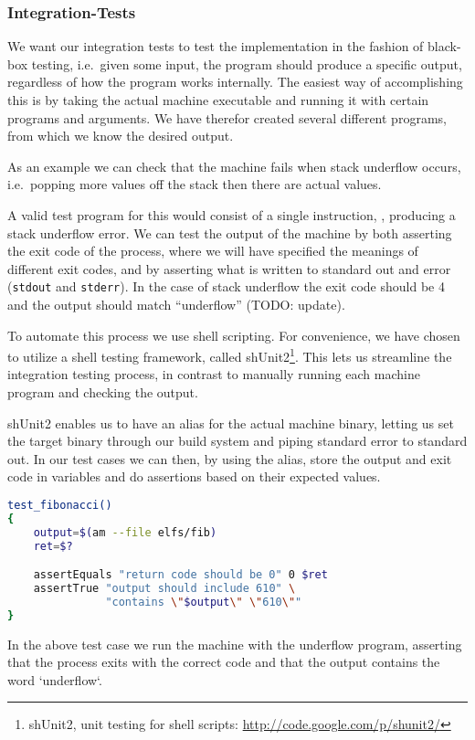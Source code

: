 \subsubsection{Integration-Tests}

We want our integration tests to test the implementation in the fashion of
black-box testing, i.e.~given some input, the program should produce a specific
output, regardless of how the program works internally. The easiest way of
accomplishing this is by taking the actual machine executable and running it
with certain programs and arguments. We have therefor created several different
programs, from which we know the desired output.

As an example we can check that the machine fails when stack underflow occurs,
i.e.\ popping more values off the stack then there are actual values.

A valid test program for this would consist of a single instruction, , producing a stack underflow error. We can test the output of the machine
by both asserting the exit code of the process, where we will have specified the
meanings of different exit codes, and by asserting what is written to standard
out and error ({\tt stdout} and {\tt stderr}). In the case of stack underflow
the exit code should be 4 and the output should match ``underflow'' (TODO:
update).

To automate this process we use shell scripting. For convenience, we have chosen
to utilize a shell testing framework, called shUnit2\footnote{shUnit2, unit
  testing for shell scripts: \url{http://code.google.com/p/shunit2/}}. This lets
us streamline the integration testing process, in contrast to manually running
each machine program and checking the output.

shUnit2 enables us to have an alias for the actual machine binary, letting us
set the target binary through our build system and piping standard error to
standard out. In our test cases we can then, by using the alias, store the
output and exit code in variables and do assertions based on their expected
values.

\begin{minipage}{\linewidth}
\begin{lstlisting}[language={sh},caption={shUnit2 underflow test case}]
test_fibonacci()
{
    output=$(am --file elfs/fib)
    ret=$?

    assertEquals "return code should be 0" 0 $ret
    assertTrue "output should include 610" \
               "contains \"$output\" \"610\""
}
\end{lstlisting}
\end{minipage}

In the above test case we run the machine with the underflow program, asserting
that the process exits with the correct code and that the output contains the
word `underflow`.

